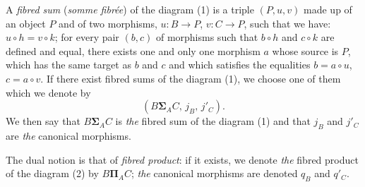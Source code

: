 A \emph{fibred sum} (\emph{somme fibrée}) of the diagram (1) is a triple
$(P,u,v)$ made up of an object $P$ and of two morphisms, $u\colon B\to P$,
$v\colon C\to P$, such that we have: $u\circ h = v\circ k$; for every pair
$(b,c)$ of morphisms such that $b\circ h$ and $c\circ k$ are defined and
equal, there exists one and only one morphism $a$ whose source is $P$, which
has the same target as $b$ and $c$ and which satisfies the equalities
$b = a\circ u$, $c = a\circ v$. If there exist fibred sums of the diagram (1),
we choose one of them which we denote by
\[
  (B\boldsymbol{\Sigma}_A C,\, j_B,\, j'_C).
\]
We then say that $B\boldsymbol{\Sigma}_A C$ is \emph{the} fibred sum of the
diagram (1) and that $j_B$ and $j'_C$ are \emph{the} canonical morphisms.

The dual notion is that of \emph{fibred product}: if it exists, we denote
\emph{the} fibred product of the diagram (2) by $B\boldsymbol{\Pi}_A C$;
\emph{the} canonical morphisms are denoted $q_B$ and $q'_C$.
